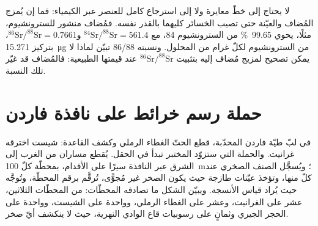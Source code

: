 لا يحتاج  إلى خطّ معايرة ولا إلى استرجاع كامل للعنصر عبر
الكيمياء: فما إن يُمزج المُضاف والعيّنة حتى تصيب الخسائر كليهما بالقدر نفسه. فمُضاف
منشور للسترونشيوم، مثلًا، يحوي \qty{99.65}{\percent} من السترونشيوم 84، مع
$^{84}\mathrm{Sr}/^{88}\mathrm{Sr} = 561.4$ و$^{86}\mathrm{Sr}/^{88}\mathrm{Sr} = 0.7661$، بتركيز
\qty{15.271}{\micro\gram} من السترونشيوم لكلّ غرام من المحلول. ونسبته 86/88 تبيّن لماذا لا يمكن
تصحيح  لمزيج مُضاف إليه بتثبيت $^{86}\mathrm{Sr}/^{88}\mathrm{Sr}$ عند
قيمتها الطبيعية: فالمُضاف قد غيّر تلك النسبة.

\section{حملة رسم خرائط على نافذة فاردن}\label{sec:b2:field-lab-methods-2:campaign}

في لبّ طيّة فاردن المحدّبة، قطع الحتّ الغطاء الرملي وكشف
القاعدة: شيست اخترقه غرانيت. والحملة التي ستزوّد المختبر تبدأ في
الحقل. يُقطع مساران من الغرب إلى الشرق عبر النافذة سيرًا على الأقدام، بمحطّة كلّ
\qty{100}{m}؛ ويُسجَّل الصنف الصخري عند كلّ منها، وتؤخذ عيّنات طازجة حيث يكون الصخر
غير مُجوًّى، تُرقَّم برقم المحطّة، وتُوجَّه حيث يُراد قياس الأنسجة. ويبيّن
الشكل ما تصادفه المحطّات: من المحطّات الثلاثين، عشر على الغرانيت، وعشر على الغطاء الرملي، وواحدة على
الشيست، وواحدة على الحجر الجيري وثمانٍ على رسوبيات قاع الوادي النهرية، حيث لا ينكشف
أيّ صخر.

